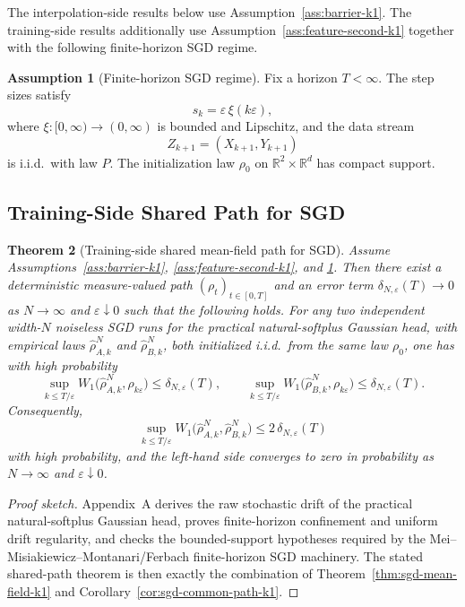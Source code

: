 \documentclass[11pt]{article}
\newtheorem{theorem}{Theorem}
\theoremstyle{definition}
\newtheorem{assumption}[theorem]{Assumption}
\newcommand{\R}{\mathbb{R}}
\begin{document}
The interpolation-side results below use Assumption~\ref{ass:barrier-k1}. The
training-side results additionally use
Assumption~\ref{ass:feature-second-k1} together with the following
finite-horizon SGD regime.

\begin{assumption}[Finite-horizon SGD regime]
\label{ass:softplus-sgd-k1}
Fix a horizon $T<\infty$. The step sizes satisfy
\[
  s_k=\varepsilon\,\xi(k\varepsilon),
\]
where $\xi:[0,\infty)\to(0,\infty)$ is bounded and Lipschitz, and the data
stream
\[
  Z_{k+1}=(X_{k+1},Y_{k+1})
\]
is i.i.d.\ with law $P$. The initialization law $\rho_0$ on
$\R^2\times\R^d$ has compact support.
\end{assumption}

\subsection{Training-Side Shared Path for SGD}

\begin{theorem}[Training-side shared mean-field path for SGD]
\label{thm:main-shared-path-k1}
Assume Assumptions~\ref{ass:barrier-k1}, \ref{ass:feature-second-k1}, and
\ref{ass:softplus-sgd-k1}. Then there exist a deterministic measure-valued path
$(\rho_t)_{t\in[0,T]}$ and an error term
$\delta_{N,\varepsilon}(T)\to 0$ as $N\to\infty$ and $\varepsilon\downarrow 0$
such that the following holds. For any two independent width-$N$ noiseless SGD
runs for the practical natural-softplus Gaussian head, with empirical laws
$\hat\rho_{A,k}^N$ and $\hat\rho_{B,k}^N$, both initialized i.i.d.\ from the
same law $\rho_0$, one has with high probability
\[
  \sup_{k\le T/\varepsilon}
  W_1\!\bigl(\hat\rho_{A,k}^N,\rho_{k\varepsilon}\bigr)
  \le
  \delta_{N,\varepsilon}(T),
  \qquad
  \sup_{k\le T/\varepsilon}
  W_1\!\bigl(\hat\rho_{B,k}^N,\rho_{k\varepsilon}\bigr)
  \le
  \delta_{N,\varepsilon}(T).
\]
Consequently,
\[
  \sup_{k\le T/\varepsilon}
  W_1\!\bigl(\hat\rho_{A,k}^N,\hat\rho_{B,k}^N\bigr)
  \le
  2\,\delta_{N,\varepsilon}(T)
\]
with high probability, and the left-hand side converges to zero in probability
as $N\to\infty$ and $\varepsilon\downarrow 0$.
\end{theorem}

\begin{proof}[Proof sketch]
Appendix~A derives the raw stochastic drift of the practical natural-softplus
Gaussian head, proves finite-horizon confinement and uniform drift regularity,
and checks the bounded-support hypotheses required by the
Mei--Misiakiewicz--Montanari/Ferbach finite-horizon SGD machinery. The stated
shared-path theorem is then exactly the combination of
Theorem~\ref{thm:sgd-mean-field-k1} and
Corollary~\ref{cor:sgd-common-path-k1}.
\end{proof}
\end{document}

